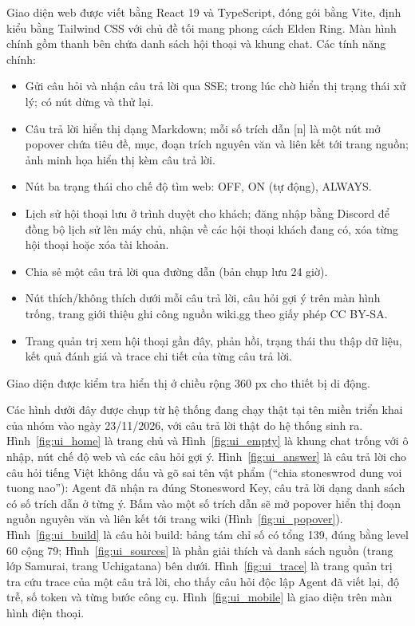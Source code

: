 Giao diện web được viết bằng React 19 và TypeScript, đóng gói bằng Vite, định kiểu bằng Tailwind CSS với chủ đề tối mang phong cách Elden Ring. Màn hình chính gồm thanh bên chứa danh sách hội thoại và khung chat. Các tính năng chính:
\begin{itemize}
    \item Gửi câu hỏi và nhận câu trả lời qua SSE; trong lúc chờ hiển thị trạng thái xử lý; có nút dừng và thử lại.
    \item Câu trả lời hiển thị dạng Markdown; mỗi số trích dẫn [n] là một nút mở popover chứa tiêu đề, mục, đoạn trích nguyên văn và liên kết tới trang nguồn; ảnh minh họa hiển thị kèm câu trả lời.
    \item Nút ba trạng thái cho chế độ tìm web: OFF, ON (tự động), ALWAYS.
    \item Lịch sử hội thoại lưu ở trình duyệt cho khách; đăng nhập bằng Discord để đồng bộ lịch sử lên máy chủ, nhận về các hội thoại khách đang có, xóa từng hội thoại hoặc xóa tài khoản.
    \item Chia sẻ một câu trả lời qua đường dẫn (bản chụp lưu 24 giờ).
    \item Nút thích/không thích dưới mỗi câu trả lời, câu hỏi gợi ý trên màn hình trống, trang giới thiệu ghi công nguồn wiki.gg theo giấy phép CC BY-SA.
    \item Trang quản trị xem hội thoại gần đây, phản hồi, trạng thái thu thập dữ liệu, kết quả đánh giá và trace chi tiết của từng câu trả lời.
\end{itemize}
Giao diện được kiểm tra hiển thị ở chiều rộng 360 px cho thiết bị di động.

Các hình dưới đây được chụp từ hệ thống đang chạy thật tại tên miền triển khai của nhóm vào ngày 23/11/2026, với câu trả lời thật do hệ thống sinh ra. Hình~\ref{fig:ui_home} là trang chủ và Hình~\ref{fig:ui_empty} là khung chat trống với ô nhập, nút chế độ web và các câu hỏi gợi ý. Hình~\ref{fig:ui_answer} là câu trả lời cho câu hỏi tiếng Việt không dấu và gõ sai tên vật phẩm (``chia stoneswrod dung voi tuong nao''): Agent đã nhận ra đúng Stonesword Key, câu trả lời dạng danh sách có số trích dẫn ở từng ý. Bấm vào một số trích dẫn sẽ mở popover hiển thị đoạn nguồn nguyên văn và liên kết tới trang wiki (Hình~\ref{fig:ui_popover}). Hình~\ref{fig:ui_build} là câu hỏi build: bảng tám chỉ số có tổng 139, đúng bằng level 60 cộng 79; Hình~\ref{fig:ui_sources} là phần giải thích và danh sách nguồn (trang lớp Samurai, trang Uchigatana) bên dưới. Hình~\ref{fig:ui_trace} là trang quản trị tra cứu trace của một câu trả lời, cho thấy câu hỏi độc lập Agent đã viết lại, độ trễ, số token và từng bước công cụ. Hình~\ref{fig:ui_mobile} là giao diện trên màn hình điện thoại.

